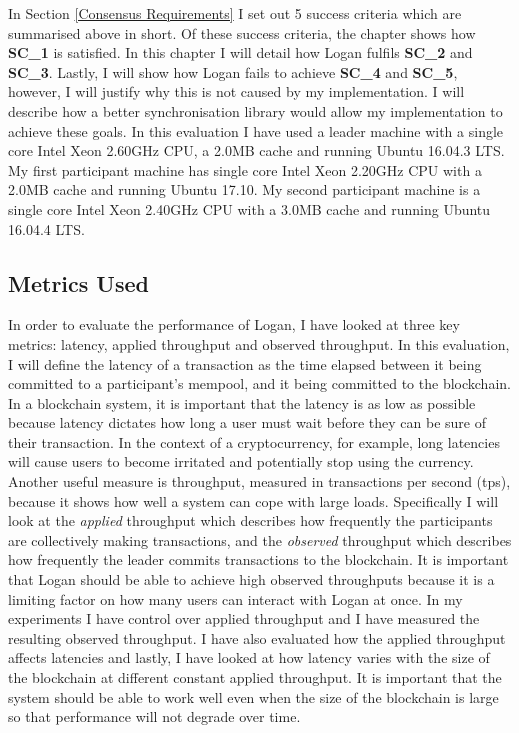 \documentclass[12pt,a4paper,twoside,openright]{report}
\begin{document}
	In Section \ref{Consensus Requirements} I set out 5 success criteria which are summarised above in short.
	Of these success criteria, the  chapter shows how \textbf{SC\_1} is satisfied.
	In this chapter I will detail how Logan fulfils \textbf{SC\_2} and \textbf{SC\_3}.
	Lastly, I will show how Logan fails to achieve \textbf{SC\_4} and \textbf{SC\_5}, however, I will justify why this is not caused by my implementation.
	I will describe how a better synchronisation library would allow my implementation to achieve these goals.
	In this evaluation I have used a leader machine with a single core Intel Xeon 2.60GHz CPU, a 2.0MB cache and running Ubuntu 16.04.3 LTS. 
	My first participant machine has single core Intel Xeon 2.20GHz CPU with a 2.0MB cache and running Ubuntu 17.10.
	My second participant machine is a single core Intel Xeon 2.40GHz CPU with a 3.0MB cache and running Ubuntu 16.04.4 LTS.

	\subsection*{Metrics Used}
	In order to evaluate the performance of Logan, I have looked at three key metrics: latency, applied throughput and observed throughput.
	In this evaluation, I will define the latency of a transaction as the time elapsed between it being committed to a participant's mempool, and it being committed to the blockchain.
	In a blockchain system, it is important that the latency is as low as possible because latency dictates how long a user must wait before they can be sure of their transaction.
	In the context of a cryptocurrency, for example, long latencies will cause users to become irritated and potentially stop using the currency.
	Another useful measure is throughput, measured in transactions per second (tps), because it shows how well a system can cope with large loads.
	Specifically I will look at the \textit{applied} throughput which describes how frequently the participants are collectively making transactions, and the \textit{observed} throughput which describes how frequently the leader commits transactions to the blockchain.
	It is important that Logan should be able to achieve high observed throughputs because it is a limiting factor on how many users can interact with Logan at once.
	In my experiments I have control over applied throughput and I have measured the resulting observed throughput.
	I have also evaluated how the applied throughput affects latencies and lastly, I have looked at how latency varies with the size of the blockchain at different constant applied throughput.
	It is important that the system should be able to work well even when the size of the blockchain is large so that performance will not degrade over time.
	
\end{document}
